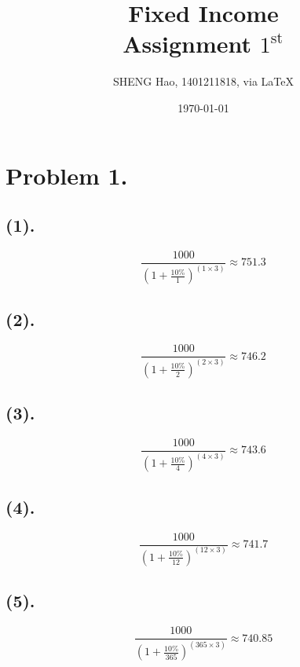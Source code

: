 \documentclass{article}
\begin{document}
\title{Fixed Income\\Assignment $1^{\text{st}}$}
\author{{\normalsize SHENG Hao, 1401211818, via \LaTeX}}
\date{\today} 

\maketitle

\def \Pr{{\rm Pr}}
\baselineskip 0.6cm


\section{Problem 1.}
\subsection{(1).}
\begin{equation}
   \frac{1000}{(1+\frac{10\%}{1})^{(1 \times 3)}} \approx 751.3
 \end{equation} 

\subsection{(2).}
\begin{equation}
   \frac{1000}{(1+\frac{10\%}{2})^{(2 \times 3)}} \approx 746.2
 \end{equation} 

\subsection{(3).}
\begin{equation}
   \frac{1000}{(1+\frac{10\%}{4})^{(4 \times 3)}} \approx 743.6
 \end{equation} 

\subsection{(4).}
\begin{equation}
   \frac{1000}{(1+\frac{10\%}{12})^{(12 \times 3)}} \approx 741.7
 \end{equation} 

\subsection{(5).}
\begin{equation}
   \frac{1000}{(1+\frac{10\%}{365})^{(365 \times 3)}} \approx 740.85
 \end{equation} 
 
\end{document}
